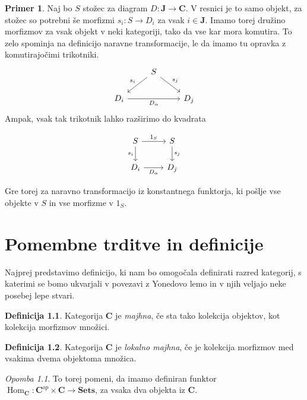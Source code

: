 \documentclass[12pt,a4paper]{book}
\theoremstyle{definition}
\newtheorem{definicija}{Definicija}[chapter]
\theoremstyle{plain}
\theoremstyle{definition}
\newtheorem{primer}{Primer}[section]
\theoremstyle{remark}
\newtheorem*{opomba}{Opomba}
\newcommand{\cat}[1]{\textbf{#1}}
\DeclareMathOperator{\Hom}{Hom}
\begin{document}
\begin{primer}
Naj bo $S$ stožec za diagram $D : \cat{J} \to \cat{C}$. V resnici je to samo objekt, za stožec so potrebni še morfizmi $s_i : S \to D_i$ za vsak $i \in \cat{J}$. Imamo torej družino morfizmov za vsak objekt v neki kategoriji, tako da vse kar mora komutira. To zelo spominja na definicijo naravne transformacije, le da imamo tu opravka z komutirajočimi trikotniki.
$$ \begin{tikzcd}
& S \ar[dl, "s_i"'] \ar[dr, "s_j"] & \\
D_i \ar[rr, "D_\alpha"'] & & D_j
\end{tikzcd} $$
Ampak, vsak tak trikotnik lahko razširimo do kvadrata

$$ \begin{tikzcd}
S \ar[d, "s_i"'] \ar[r, "1_S"] & S \ar[d, "s_j"]\\
D_i \ar[r, "D_\alpha"'] & D_j
\end{tikzcd} $$

Gre torej za naravno transformacijo iz konstantnega funktorja, ki pošlje vse objekte v $S$ in vse morfizme v $1_S$.

\end{primer}


\chapter{Pomembne trditve in definicije}

Najprej predstavimo definicijo, ki nam bo omogočala definirati razred kategorij, s katerimi se bomo ukvarjali v povezavi z Yonedovo lemo in v njih veljajo neke posebej lepe stvari.

\begin{definicija}
Kategorija $\cat{C}$ je \emph{majhna}, če sta tako kolekcija objektov, kot kolekcija morfizmov množici.
\end{definicija}

\begin{definicija}
Kategorija $\cat{C}$ je \emph{lokalno majhna}, če je kolekcija morfizmov med vsakima dvema objektoma množica.
\end{definicija}
\begin{opomba}
To torej pomeni, da imamo definiran funktor $\Hom_{\cat{C}} : \cat{C}^{op} \times \cat{C} \to \cat{Sets}$, za vsaka dva objekta iz $\cat{C}$.
\end{opomba}
\end{document}
